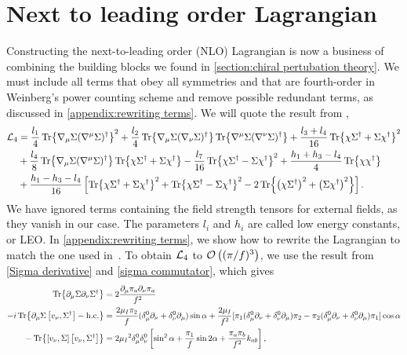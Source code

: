 \section{Next to leading order Lagrangian}

Constructing the next-to-leading order (NLO) Lagrangian is now a business of combining the building blocks we found in \autoref{section:chiral pertubation theory}. 
We must include all terms that obey all symmetries and that are fourth-order in Weinberg's power counting scheme and remove possible redundant terms, as discussed in \autoref{appendix:rewriting terms}.
We will quote the result from \cite{Scherer2002IntroductionTC},
\begin{align}
    \notag
    \Ell_4 
    & = 
    \frac{l_1}{4}\Tr{\nabla_\mu \Sigma (\nabla^\mu \Sigma)^\dagger}^2
    + \frac{l_2}{4} \Tr{\nabla_\mu \Sigma (\nabla_\nu \Sigma)^\dagger} 
    \Tr{\nabla^\mu \Sigma (\nabla^\nu \Sigma)^\dagger} 
    +
    \frac{l_3 + l_4}{16} \Tr{\chi \Sigma^\dagger + \Sigma \chi^\dagger}^2
    \\ \notag
    &
    + \frac{l_4}{8}\Tr{\nabla_\mu \Sigma (\nabla^\mu \Sigma)^\dagger} \Tr{\chi \Sigma^\dagger + \Sigma \chi^\dagger}
    - \frac{l_7}{16} \Tr{\chi \Sigma^\dagger - \Sigma \chi^\dagger}^2
    + \frac{h_1 + h_3 - l_4}{4} \Tr{\chi \chi^\dagger} \\
    & +
    \frac{h_1 - h_3 - l_4}{16}
    \left[
        \Tr{\chi \Sigma^\dagger + \Sigma \chi^\dagger}^2
        + \Tr{\chi \Sigma^\dagger - \Sigma \chi^\dagger}^2
        -2 \Tr{\left(\chi \Sigma^\dagger\right)^2 + \left( \Sigma \chi^\dagger\right)^2}
    \right]
    \label{NLO Lagrangian}.
\end{align}
%
We have ignored terms containing the field strength tensors for external fields, as they vanish in our case.
The parameters $l_i$ and $h_i$ are called low energy constants, or LEO.
In \autoref{appendix:rewriting terms}, we show how to rewrite the Lagrangian to match the one used in~\cite{Andersen:two-flavor-chpt,mojahed}.
To obtain $\Ell_4$ to $\Oh[3]{(\pi/f)}$, we use the result from \autoref{Sigma derivative} and \autoref{sigma commutator}, which gives
\begin{align*}
    \Tr{\partial_\mu \Sigma \partial_\nu \Sigma^\dagger}
    & = 2 \frac{\partial_\mu \pi_a \partial_\nu \pi_a}{f^2} \\
    -i \Tr{\partial_\mu \Sigma \com{v_\nu}{\Sigma^\dagger} - \hc}
    & = 
    \frac{2\mu_I\pi_2}{f}(\delta_\mu^0\partial_\nu + \delta_\nu^0\partial_\mu)\sin{\alpha} + 
    \frac{2\mu_I}{f^2}
    [
        \pi_1 (\delta_\mu^0\partial_\nu + \delta_\nu^0\partial_\mu)\pi_2 
        - \pi_2 (\delta_\mu^0\partial_\nu + \delta_\nu^0\partial_\mu)\pi_1
    ]\cos{\alpha}
    \\
    - \Tr{\com{v_\nu}{\Sigma} \com{v_\nu}{\Sigma^\dagger}}
    & = 2 \mu_I{}^2 \delta_\mu^0 \delta_\nu^0 
    \left[
        \sin^2{\alpha} + \frac{\pi_1}{f} \sin{2\alpha} 
        + \frac{\pi_a \pi_b}{f^2} 
        k_{ab}
    \right],
\end{align*}
